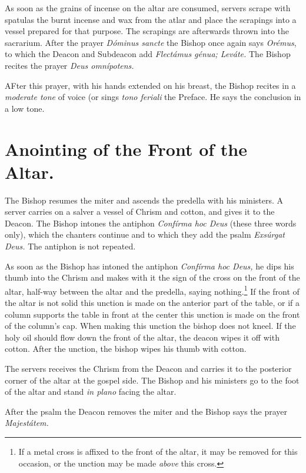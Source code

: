 \documentclass[letterpaper]{report}
\begin{document}
{\rubric As soon as the grains of incense on the altar are consumed, servers
scrape with spatulas the burnt incense and wax from the atlar and place the
scrapings into a vessel prepared for that purpose. The scrapings are afterwards
thrown into the sacrarium. After the prayer \textit{Dóminus sancte} the Bishop
once again says \textit{Orémus}, to which the Deacon and Subdeacon add
\textit{Flectámus génua; Leváte.} The Bishop recites the prayer \textit{Deus
omnípotens.}

\rubric AFter this prayer, with his hands extended on his breast, the Bishop
recites in a \textit{moderate tone} of voice (or sings \textit{tono feriali}
the Preface. He says the conclusion in a low tone.

\section{Anointing of the Front of the Altar.}

\rubric The Bishop resumes the miter and ascends the predella with his
ministers. A server carries on a salver a vessel of Chrism and cotton, and
gives it to the Deacon. The Bishop intones the antiphon \textit{Confírma hoc
Deus} (these three words only), which the chanters continue and to which they
add the psalm \textit{Exsúrgat Deus.} The antiphon is not repeated.

\rubric As soon as the Bishop has intoned the antiphon \textit{Confírma hoc
Deus,} he dips his thumb into the Chrism and makes with it the sign of the
cross on the front of the altar, half-way between the altar and the predella,
saying nothing.\footnote{If a metal cross is affixed to the front of the altar,
it may be removed for this occasion, or the unction may be made \textit{above}
this cross.} If the front of the altar is not solid this unction is made on the
anterior part of the table, or if a column supports the table in front at the
center this unction is made on the front of the column's cap. When making this
unction the bishop does not kneel. If the holy oil should flow down the front
of the altar, the deacon wipes it off with cotton. After the unction, the
bishop wipes his thumb with cotton.

\rubric The servers receives the Chrism from the Deacon and carries it to the
posterior corner of the altar at the gospel side. The Bishop and his ministers
go to the foot of the altar and stand \textit{in plano} facing the altar.

After the psalm the Deacon removes the miter and the Bishop says the prayer
\textit{Majestátem.}

}
\end{document}
